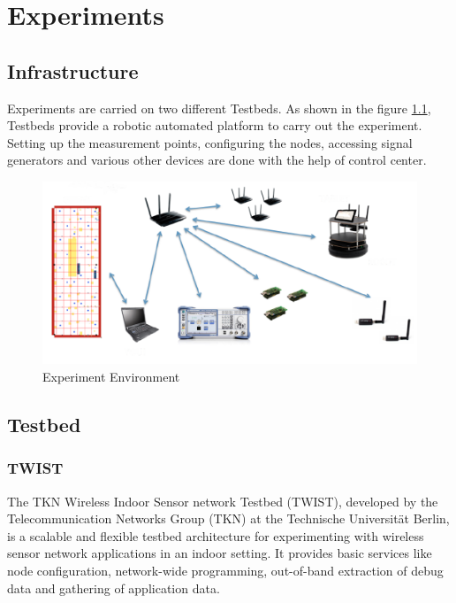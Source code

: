 \documentclass[11pt,a4paper,headinclude,footinclude,chapterprefix=on]{scrreprt}
\begin{document}
\chapter{Experiments} 
\section{Infrastructure} 
Experiments are carried on two different Testbeds. As shown in the figure \ref{fig:experiment}, Testbeds provide a robotic automated platform to carry out the experiment. Setting up the measurement points, configuring the nodes, accessing signal generators and various other devices are done with the help of control center. 

\begin{figure}
	[!h] \centering 
	\includegraphics[width=15cm]{Images/evari.png} \caption{Experiment Environment} \label{fig:experiment} 
\end{figure}

\section{Testbed}
\subsection{TWIST}
The TKN Wireless Indoor Sensor network Testbed (TWIST), developed by the Telecommunication Networks Group (TKN) at the Technische Universität Berlin, is a scalable and flexible testbed architecture for experimenting with wireless sensor network applications in an indoor setting. It provides basic services like node configuration, network-wide programming, out-of-band extraction of debug data and gathering of application data.
\end{document}
